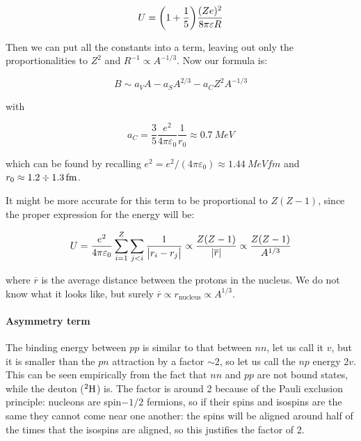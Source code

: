 \documentclass[main.tex]{subfiles}
\begin{document}
\begin{equation}
    U = \qty(1 + \frac{1}{5}) \frac{(Ze)^2}{8 \pi \varepsilon R}
\end{equation}

Then we can put all the constants into a term, leaving out only the proportionalities to \(Z^2\) and \(R^{-1} \propto A^{-1/3}\). Now our formula is:

\begin{equation}
    B \sim a_V A - a_S A ^{2/3} - a_C Z^2 A ^{-1/3}
\end{equation}

with

\begin{equation}
    a_C = \frac{3}{5} \frac{e^2}{4 \pi \varepsilon_0} \frac{1}{r_0} \approx \SI{0.7}{MeV}
\end{equation}

which can be found by recalling \(e^2 = e^2 / (4 \pi \varepsilon_0) \approx \SI{1.44}{MeV fm} \) and \(r_0 \approx 1.2 \divisionsymbol \SI{1.3}{fm} \).

It might be more accurate for this term to be proportional to \(Z(Z-1)\), since the proper expression for the energy will be:

\begin{equation} \label{eq:SEMF-coulomb-correction}
    U = \frac{e^2}{4 \pi \varepsilon_0} \sum _{i=1}   ^{Z} \sum _{j<i} \frac{1}{\abs{r_i - r_j} }  \propto \frac{Z(Z-1)}{\abs{\overline{r} } }  \propto \frac{Z(Z-1)}{A^{1/3}}
\end{equation}

where \(\overline{r} \) is the average distance between the protons in the nucleus. We do not know what it looks like, but surely \(\overline{r} \propto r _{\text{nucleus}}  \propto A^{1/3}\).

\paragraph{Asymmetry term}

The binding energy between \(pp\) is similar to that between \(nn\), let us call it \(v\), but it is smaller than the \(pn\) attraction by a factor \(\sim 2\), so let us call the \(np\) energy \(2v\). This can be seen empirically from the fact that \(nn\) and \(pp\) are not bound states, while the deuton (\(^{2} \ce{H} \)) is.
The factor is around 2 because of the Pauli exclusion principle: nucleons are spin\(-1/2\) fermions, so if their spins and isospins are the same they cannot come near one another: the spins will be aligned around half of the times that the isospins are aligned, so this justifies the factor of 2.
\end{document}
